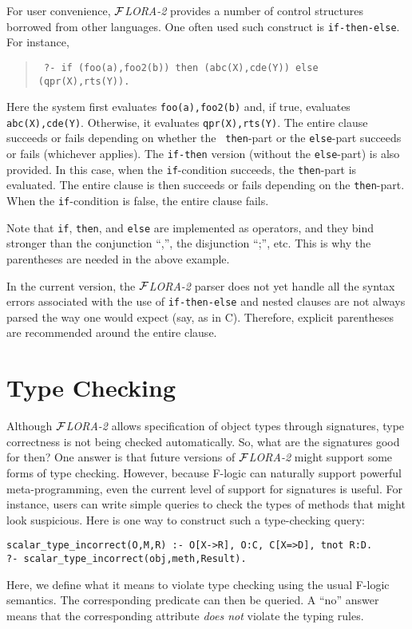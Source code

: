 \documentclass[11pt]{article}
\newcommand{\FLORA}{{\mbox{${\cal F}${\small\it LORA}\rm\emph{-2}}}\xspace}
\newcommand{\fl}{\mbox{F-logic}\xspace}
\begin{document}
For user convenience, \FLORA provides a number of control structures
borrowed from other languages. One often used such construct is
{\tt if-then-else}. For instance, 
\begin{quote}
 \tt
 ?- if (foo(a),foo2(b)) then (abc(X),cde(Y)) else (qpr(X),rts(Y)).
\end{quote}
Here the system first evaluates {\tt foo(a),foo2(b)} and, if true,
evaluates {\tt abc(X),cde(Y)}. Otherwise, it evaluates {\tt qpr(X),rts(Y)}.
The entire clause succeeds or fails depending on whether the {\tt
  then}-part or the {\tt else}-part succeeds or fails (whichever applies).
The {\tt if-then} version (without the {\tt else}-part) is also provided.
In this case, when the {\tt if}-condition succeeds, the {\tt then}-part is
evaluated. The entire clause is then succeeds or fails depending on the
{\tt then}-part. When the {\tt if}-condition is false, the entire clause fails.

Note that {\tt if}, {\tt then}, and {\tt else} are implemented as
operators, and they bind stronger than the conjunction ``,'', the
disjunction ``;'', etc. This is why the parentheses are needed in the above
example.

In the current version, the \FLORA parser does not yet handle all the
syntax errors associated with the use of {\tt if-then-else} and nested
clauses are not always parsed the way one would expect (say, as in C).
Therefore, explicit parentheses are recommended around the entire clause. 



\section{Type Checking}


Although \FLORA allows specification of object types through signatures,
type correctness is not being checked automatically. So, what are the
signatures good for then? One answer is that future versions of \FLORA
might support some forms of type checking. However, because \fl can
naturally support powerful meta-programming, even the current level
of support for signatures is useful. For instance, users can write
simple queries to check the types of methods that might look suspicious.
Here is one way to construct such a type-checking query:
\begin{verbatim}
scalar_type_incorrect(O,M,R) :- O[X->R], O:C, C[X=>D], tnot R:D.
?- scalar_type_incorrect(obj,meth,Result).
\end{verbatim}
Here, we define what it means to violate type checking using the usual
\fl semantics. The corresponding predicate can then be queried. A
``no'' answer means that the corresponding attribute \emph{does not}
violate the typing rules.
\end{document}
